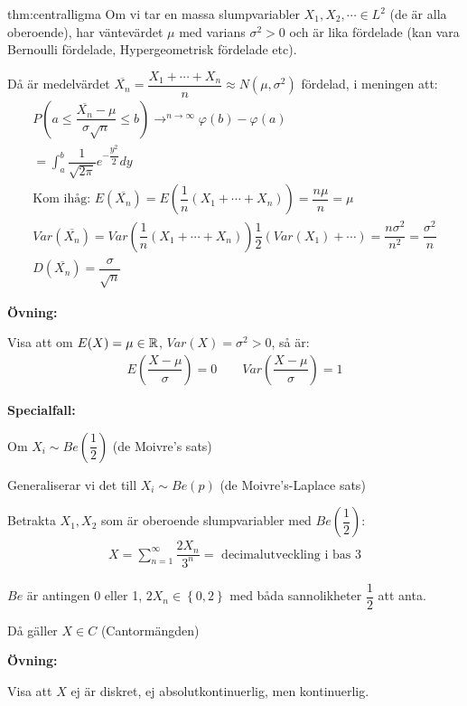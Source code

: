 \newpage
\begin{theo}{thm:centralligma}
  Om vi tar en massa slumpvariabler $X_1,X_2,\cdots\in L^2$ (de är alla oberoende), har väntevärdet $\mu$ med varians $\sigma^2>0$ och är lika fördelade (kan vara Bernoulli fördelade, Hypergeometrisk fördelade etc).
  \par\bigskip
  \noindent Då är medelvärdet $\overline{X_n} =\dfrac{X_1+\cdots+X_n}{n}\approx N(\mu,\sigma^2)$ fördelad, i meningen att:
  \begin{equation*}
    \begin{gathered}
      P\left(a\leq \dfrac{\overline{X_n}-\mu}{\sigma\sqrt{n}}\leq b\right)\to^{n\to\infty}\varphi(b)-\varphi(a)\\
      = \int_{a}^{b}\dfrac{1}{\sqrt{2\pi}}e^{-\dfrac{y^2}{2}}dy\\
      \text{Kom ihåg: } E(\overline{X_n}) = E(\dfrac{1}{n}(X_1+\cdots+X_n)) = \dfrac{n\mu}{n} = \mu\\
      Var(\overline{X_n}) = Var(\dfrac{1}{n}(X_1+\cdots+X_n)) \dfrac{1}{2}\left(Var(X_1)+\cdots\right) = \dfrac{n\sigma^2}{n^2} = \dfrac{\sigma^2}{n}\\
      D(\overline{X_n}) = \dfrac{\sigma}{\sqrt{n}}
    \end{gathered}
  \end{equation*}
\end{theo}
\par\bigskip
\noindent\textbf{Övning:}\par
\noindent Visa att om $E(X) = \mu\in\mathbb{R}$, $Var(X) = \sigma^2>0$, så är:
\begin{equation*}
  \begin{gathered}
    E\left(\dfrac{X-\mu}{\sigma}\right) = 0\qquad Var\left(\dfrac{X-\mu}{\sigma}\right)=1
  \end{gathered}
\end{equation*}
\par\bigskip
\noindent\textbf{Specialfall:}\par
\noindent Om $X_i\sim Be(\dfrac{1}{2})$ (de Moivre's sats)\par
\noindent Generaliserar vi det till $X_i\sim Be(p)$ (de Moivre's-Laplace sats)
\par\bigskip
\noindent Betrakta $X_1,X_2$ som är oberoende slumpvariabler med $Be(\dfrac{1}{2})$:
\begin{equation*}
  \begin{gathered}
    X = \sum_{n=1}^{\infty}\dfrac{2X_n}{3^n}= \text{ decimalutveckling i bas 3}
  \end{gathered}
\end{equation*}\par
\noindent $Be$ är antingen 0 eller 1, $2X_n\in\left\{0,2\right\}$ med båda sannolikheter $\dfrac{1}{2}$ att anta.\par
\noindent Då gäller $X\in C$ (Cantormängden)
\par\bigskip
\noindent\textbf{Övning:}\par
\noindent Visa att $X$ ej är diskret, ej absolutkontinuerlig, men kontinuerlig.
